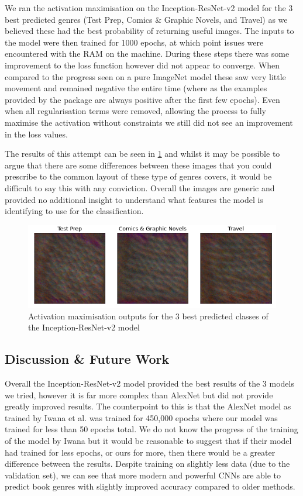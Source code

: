 \documentclass[12pt]{article}
\numberwithin{equation}{section}
\numberwithin{figure}{section}
\begin{document}
We ran the activation maximisation on the Inception-ResNet-v2 model for the 3 best predicted genres (Test Prep, Comics \& Graphic Novels, and Travel) as we believed these had the best probability of returning useful images. The inputs to the model were then trained for 1000 epochs, at which point issues were encountered with the RAM on the machine. During these steps there was some improvement to the loss function however did not appear to converge. When compared to the progress seen on a pure ImageNet model these saw very little movement and remained negative the entire time (where as the examples provided by the package are always positive after the first few epochs). Even when all regularisation terms were removed, allowing the process to fully maximise the activation without constraints we still did not see an improvement in the loss values.

The results of this attempt can be seen in \cref{fig:act_max_output} and whilst it may be possible to argue that there are some differences between these images that you could prescribe to the common layout of these type of genres covers, it would be difficult to say this with any conviction. Overall the images are generic and provided no additional insight to understand what features the model is identifying to use for the classification.

\begin{figure}
	\centering
	\captionsetup{justification=centering}
	\includegraphics[scale=0.6]{visualize-dense-layer.png}
	\caption{Activation maximisation outputs for the 3 best predicted classes of the Inception-ResNet-v2 model}
	\label{fig:act_max_output}
\end{figure}

\subsection{Discussion \& Future Work} 
\label{sub:Discussion} 
Overall the Inception-ResNet-v2 model provided the best results of the 3 models we tried, however it is far more complex than AlexNet but did not provide greatly improved results. The counterpoint to this is that the AlexNet model as trained by Iwana et al. was trained for 450,000 epochs where our model was trained for less than 50 epochs total. We do not know the progress of the training of the model by Iwana but it would be reasonable to suggest that if their model had trained for less epochs, or ours for more, then there would be a greater difference between the results. Despite training on slightly less data (due to the validation set), we can see that more modern and powerful CNNs are able to predict book genres with slightly improved accuracy compared to older methods.
\end{document}
